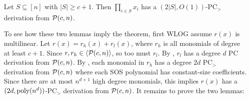 \begin{lemma}\label{lem:highdeg}
Let $S \subseteq [n]$ with $|S| \geq c+1$. Then $\prod_{i \in S} x_i$ has a $(2|S|,O(1))$-PC$_>$ derivation from $\mathcal P(c,n)$.
\end{lemma}
To see how these two lemmas imply the theorem, first WLOG assume $r(x)$ is multilinear. Let $r(x) = r_h(x) + r_l(x)$, where $r_h$ is all monomials of degree at least $c+1$. Since $r,r_h \in \langle \mathcal P(c,n)\rangle$, so too must $r_l$. By , $r_l$ has a degree $d$ PC derivation from $\mathcal P(c,n)$. By , each monomial in $r_h$ has a degree $2d$ PC$_>$ derivation from $\mathcal P(c,n)$ where each SOS polynomial has constant-size coefficients. Since there are at most $n^{d+1}$ high degree monomials, this implies $r(x)$ has a $(2d, \operatorname{poly}(n^d))$-PC$_>$ derivation from $\mathcal P(c,n)$. It remains to prove the two lemmas:

